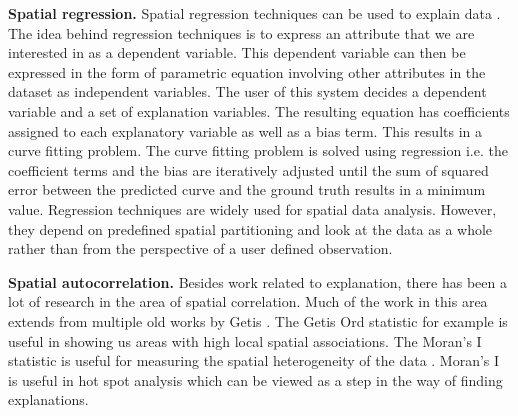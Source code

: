 {\bf Spatial regression.} Spatial regression techniques can be used to explain data \cite{dunn1986applied,cleveland1988locally}. The idea behind regression techniques is to express an attribute that we are interested in as a dependent variable. This dependent variable can then be expressed in the form of parametric equation involving other attributes in the dataset as independent variables. The user of this system decides a dependent variable and a set of explanation variables. The resulting equation has coefficients assigned to each explanatory variable as well as a bias term. This results in a curve fitting problem. The curve fitting problem is solved using regression i.e. the coefficient terms and the bias are iteratively adjusted until the sum of squared error between the predicted curve and the ground truth results in a minimum value. Regression techniques are widely used for spatial data analysis. However, they depend on predefined spatial partitioning and look at the data as a whole rather than from the perspective of a user defined observation.

{\bf Spatial autocorrelation.} Besides work related to explanation, there has been a lot of research in the area of spatial correlation. Much of the work in this area extends from multiple old works by Getis \cite{getis1991spatial,ord1995local,getis1996local,getis2002comparative,getis2007reflections}. The Getis Ord statistic \cite{ord1995local} for example is useful in showing us areas with high local spatial associations. The Moran's I statistic is useful for measuring the spatial heterogeneity of the data \cite{assuncao1999new,zhang2008use}. Moran's I is useful in hot spot analysis which can be viewed as a step in the way of finding explanations.


